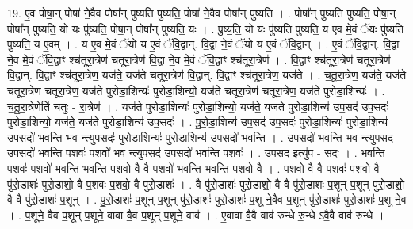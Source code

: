 \documentclass[17pt]{extarticle}
\begin{document}
19. ए॒व पोषा॒न् पोषा॑ ने॒वैव पोषा᳚न् पुष्यति पुष्यति॒ पोषा॑ ने॒वैव पोषा᳚न् पुष्यति । . पोषा᳚न् पुष्यति पुष्यति॒ पोषा॒न् पोषा᳚न् पुष्यति॒ यो यः पु॑ष्यति॒ पोषा॒न् पोषा᳚न् पुष्यति॒ यः । . पु॒ष्य॒ति॒ यो यः पु॑ष्यति पुष्यति॒ य ए॒व मे॒वं ॅयः पु॑ष्यति पुष्यति॒ य ए॒वम् । . य ए॒व मे॒वं ॅयो य ए॒वं ॅवि॒द्वान्. वि॒द्वा ने॒वं ॅयो य ए॒वं ॅवि॒द्वान् । . ए॒वं ॅवि॒द्वान्. वि॒द्वा ने॒व मे॒वं ॅवि॒द्वाꣳ श्च॑तूरा॒त्रेण॑ चतूरा॒त्रेण॑ वि॒द्वा ने॒व मे॒वं ॅवि॒द्वाꣳ 
श्च॑तूरा॒त्रेण॑ । . वि॒द्वाꣳ श्च॑तूरा॒त्रेण॑ चतूरा॒त्रेण॑ वि॒द्वान्. वि॒द्वाꣳ श्च॑तूरा॒त्रेण॒ यज॑ते॒ यज॑ते चतूरा॒त्रेण॑ वि॒द्वान्. वि॒द्वाꣳ श्च॑तूरा॒त्रेण॒ यज॑ते । . च॒तू॒रा॒त्रेण॒ यज॑ते॒ यज॑ते चतूरा॒त्रेण॑ चतूरा॒त्रेण॒ यज॑ते पुरोडा॒शिन्यः॑ पुरोडा॒शिन्यो॒ यज॑ते चतूरा॒त्रेण॑ चतूरा॒त्रेण॒ यज॑ते पुरोडा॒शिन्यः॑ । . च॒तू॒रा॒त्रेणेति॑ चतुः - रा॒त्रेण॑ । . यज॑ते पुरोडा॒शिन्यः॑ पुरोडा॒शिन्यो॒ यज॑ते॒ यज॑ते पुरोडा॒शिन्य॑ उप॒सद॑ उप॒सदः॑ पुरोडा॒शिन्यो॒ यज॑ते॒ यज॑ते पुरोडा॒शिन्य॑ उप॒सदः॑ । . पु॒रो॒डा॒शिन्य॑ उप॒सद॑ उप॒सदः॑ पुरोडा॒शिन्यः॑ पुरोडा॒शिन्य॑ उप॒सदो॑ भवन्ति भव न्त्युप॒सदः॑ पुरोडा॒शिन्यः॑ पुरोडा॒शिन्य॑ उप॒सदो॑ भवन्ति । . उ॒प॒सदो॑ भवन्ति भव न्त्युप॒सद॑ उप॒सदो॑ भवन्ति प॒शवः॑ प॒शवो॑ भव न्त्युप॒सद॑ उप॒सदो॑ भवन्ति प॒शवः॑ । . उ॒प॒सद॒ इत्यु॑प - सदः॑ । . भ॒व॒न्ति॒ प॒शवः॑ प॒शवो॑ भवन्ति भवन्ति प॒शवो॒ वै वै प॒शवो॑ भवन्ति भवन्ति प॒शवो॒ वै । . प॒शवो॒ वै वै प॒शवः॑ प॒शवो॒ वै पु॑रो॒डाशः॑ पुरो॒डाशो॒ वै प॒शवः॑ प॒शवो॒ वै पु॑रो॒डाशः॑ । . वै पु॑रो॒डाशः॑ पुरो॒डाशो॒ वै वै पु॑रो॒डाशः॑ प॒शून् प॒शून् पु॑रो॒डाशो॒ वै वै पु॑रो॒डाशः॑ प॒शून् । . पु॒रो॒डाशः॑ प॒शून् प॒शून् पु॑रो॒डाशः॑ पुरो॒डाशः॑ प॒शू ने॒वैव प॒शून् पु॑रो॒डाशः॑ पुरो॒डाशः॑ प॒शू ने॒व । . प॒शूने॒ वैव प॒शून् प॒शूने॒ वावा वै॒व प॒शून् प॒शूने॒ वाव॑ । . ए॒वावा वै॒वै वाव॑ रुन्धे रु॒न्धे ऽवै॒वै वाव॑ रुन्धे । \newline
\end{document}
